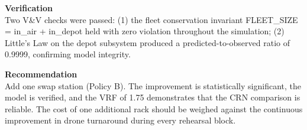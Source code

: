 \documentclass[12pt, a4paper]{article}
\begin{document}
\vspace{0.3cm}
\textbf{Verification} \\
Two V\&V checks were passed: (1) the fleet conservation invariant FLEET\_SIZE = in\_air + in\_depot held with zero violation throughout the simulation; (2) Little's Law on the depot subsystem produced a predicted-to-observed ratio of 0.9999, confirming model integrity.

\vspace{0.3cm}
\textbf{Recommendation} \\
Add one swap station (Policy B). The improvement is statistically significant, the model is verified, and the VRF of 1.75 demonstrates that the CRN comparison is reliable. The cost of one additional rack should be weighed against the continuous improvement in drone turnaround during every rehearsal block.
\end{document}
